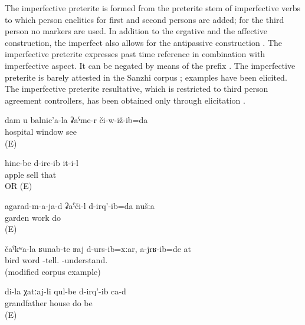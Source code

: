 The imperfective preterite is formed from the preterite stem of imperfective verbs to which person enclitics for first and second persons are added; for the third person no markers are used. In addition to the ergative and the affective construction, the imperfect also allows for the antipassive construction . The imperfective preterite expresses past time reference in combination with imperfective aspect. It can be negated by means of the prefix . The imperfective preterite is barely attested in the Sanzhi corpus ; examples  have been elicited. The imperfective preterite resultative, which is restricted to third person agreement controllers, has been obtained only through elicitation .
%
\begin{exe}
	\ex	\label{ex:I saw you (repeatedly) from the window of the hospital}
	\gll	dam	u	balnic’a-la	ʡaˁme-r	či-w-iž-ib=da\\
				hospital	window	see\\
	\glt	{} (E)

	\ex	\label{ex:S/he sold apples analytic}
	\gll	hinc-be	d-irc-ib	it-i-l\\
		apple	sell	that\\
	\glt	{} OR  (E)

	\ex	\label{ex:We (repeatedly) worked in the garden}
	\gll	agarad-m-a-ja-d	ʡaˁči-l	d-irq'-ib=da	nušːa\\
		garden	work	do	\\
	\glt	{} (E)

	\ex	\label{ex:Although I said words like a bird, you did not understand them}
	\gll	čaˁkʷa-la	ʁunab-te	ʁaj	d-urs-ib=xːar,	a-jrʁ-ib=de	at\\
		bird	 	word	-tell.	-understand.	\\
	\glt	{} (modified corpus example)
	
	\ex	\label{ex:My grandfather (apparently) built houses analytic}
	\gll	di-la	χatːaj-li	qul-be	d-irq'-ib	ca-d\\
			grandfather	house	do	be\\
	\glt	{} (E)

\end{exe}


